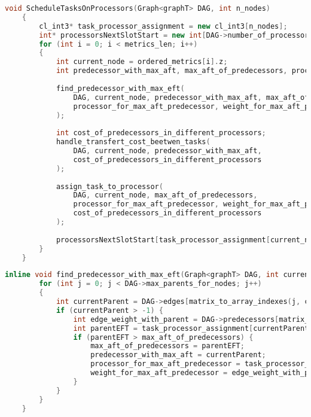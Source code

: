 \begin{lstlisting}[language=C++, caption={Algoritmo di selezione del processore},captionpos=b]
	void ScheduleTasksOnProcessors(Graph<graphT> DAG, int n_nodes)
	{
		cl_int3* task_processor_assignment = new cl_int3[n_nodes];
		int* processorsNextSlotStart = new int[DAG->number_of_processors];
		for (int i = 0; i < metrics_len; i++)
		{
			int current_node = ordered_metrics[i].z; 
			int predecessor_with_max_aft, max_aft_of_predecessors, processor_for_max_aft_predecessor, weight_for_max_aft_predecessor;
			
			find_predecessor_with_max_eft(
				DAG, current_node, predecessor_with_max_aft, max_aft_of_predecessors, 
				processor_for_max_aft_predecessor, weight_for_max_aft_predecessor
			);
			
			int cost_of_predecessors_in_different_processors;
			handle_transfert_cost_beetwen_tasks(
				DAG, current_node, predecessor_with_max_aft, 
				cost_of_predecessors_in_different_processors
			);
			
			assign_task_to_processor(
				DAG, current_node, max_aft_of_predecessors, 
				processor_for_max_aft_predecessor, weight_for_max_aft_predecessor,
				cost_of_predecessors_in_different_processors
			);
			
			processorsNextSlotStart[task_processor_assignment[current_node].x] = task_processor_assignment[current_node].z;
		}
	}
\end{lstlisting}
\begin{lstlisting}[language=C++, caption={Funzione di calcolo del predecessore con EFT massimo},captionpos=b]
	inline void find_predecessor_with_max_eft(Graph<graphT> DAG, int current_node, int predecessor_with_max_aft, int cost_of_predecessors_in_different_processors) {
		for (int j = 0; j < DAG->max_parents_for_nodes; j++)
		{
			int currentParent = DAG->edges[matrix_to_array_indexes(j, current_node, DAG->len)];
			if (currentParent > -1) {
				int edge_weight_with_parent = DAG->predecessors[matrix_to_array_indexes(j, current_node, DAG->len)];
				int parentEFT = task_processor_assignment[currentParent].z + edge_weight_with_parent;
				if (parentEFT > max_aft_of_predecessors) {
					max_aft_of_predecessors = parentEFT;
					predecessor_with_max_aft = currentParent;
					processor_for_max_aft_predecessor = task_processor_assignment[currentParent].x;
					weight_for_max_aft_predecessor = edge_weight_with_parent;
				}
			}
		}
	}
\end{lstlisting}

\newpage

